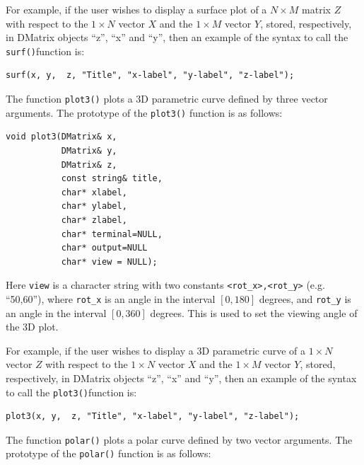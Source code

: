 \documentclass[a4paper,11pt]{report}    %
\newenvironment{shadedframe}{%
  \def\FrameCommand{\fcolorbox{black}{shadecolor}}%
  \MakeFramed {\FrameRestore}}
{\endMakeFramed}
\begin{document}
\begin{shadedframe}

For example, if the user wishes to display a surface plot of a $N \times M$ matrix $Z$
with respect to the $1 \times N$ vector $X$ and the $1 \times M$ vector $Y$,
stored, respectively, in DMatrix objects ``z'', ``x'' and ``y'', 
then an example of the syntax to call the \texttt{surf()}function is:

\begin{verbatim}
surf(x, y,  z, "Title", "x-label", "y-label", "z-label"); 
\end{verbatim}


\end{shadedframe}


The function \texttt{plot3()} plots a 3D parametric curve defined by three vector arguments. 
The prototype of the \texttt{plot3()} function is as follows:

\begin{verbatim}
void plot3(DMatrix& x, 
           DMatrix& y, 
           DMatrix& z, 
           const string& title, 
           char* xlabel, 
           char* ylabel, 
           char* zlabel, 
           char* terminal=NULL, 
           char* output=NULL
           char* view = NULL);  
\end{verbatim}
Here \verb|view| is a character string with two constants \verb|<rot_x>,<rot_y>| (e.g. ``50,60''), where
\verb|rot_x| is an angle in the interval $[0,180]$ degrees, and \verb|rot_y| is an angle in the
interval $[0,360]$ degrees. This is used to set the viewing angle of the 3D plot.


\begin{shadedframe}

For example, if the user wishes to display a 3D parametric curve of a $1 \times N$ vector $Z$
with respect to the $1 \times N$ vector $X$ and the $1 \times M$ vector $Y$,
stored, respectively, in DMatrix objects ``z'', ``x'' and ``y'', 
then an example of the syntax to call the \texttt{plot3()}function is:

\begin{verbatim}
plot3(x, y,  z, "Title", "x-label", "y-label", "z-label"); 
\end{verbatim}


\end{shadedframe}


The function \texttt{polar()} plots a polar curve defined by two vector arguments. 
The prototype of the \texttt{polar()} function is as follows:
\end{document}
